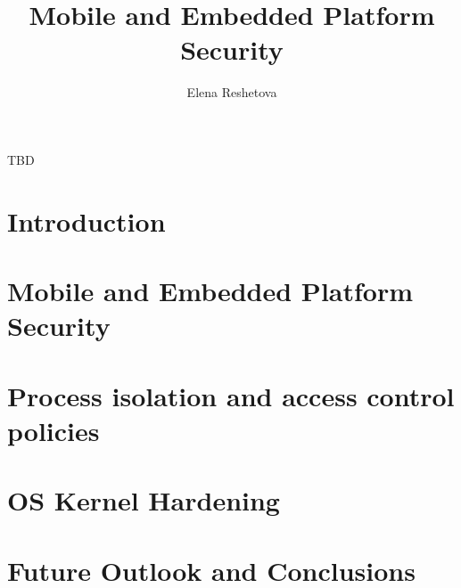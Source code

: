 \documentclass[dissertation,math,vertlayout]{aaltoseries}
\author{Elena Reshetova}
\title{Mobile and Embedded Platform Security}
\begin{document}


\begin{preface}[Sipoo]
TBD
\end{preface}

\clearpage
\tableofcontents


\listofpublications



\chapter{Introduction}
\label{sec:introduction}


                

\chapter{Mobile and Embedded Platform Security}
\label{sec:plat-sec}
 


\chapter{Process isolation and access control policies}
\label{sec:ac-policies}
 

\chapter{OS Kernel Hardening}
\label{sec:kernel-hardening}
 

\chapter{Future Outlook and Conclusions}
\label{sec:discussion}
 

\renewcommand{\bibname}{References}
\end{document}
